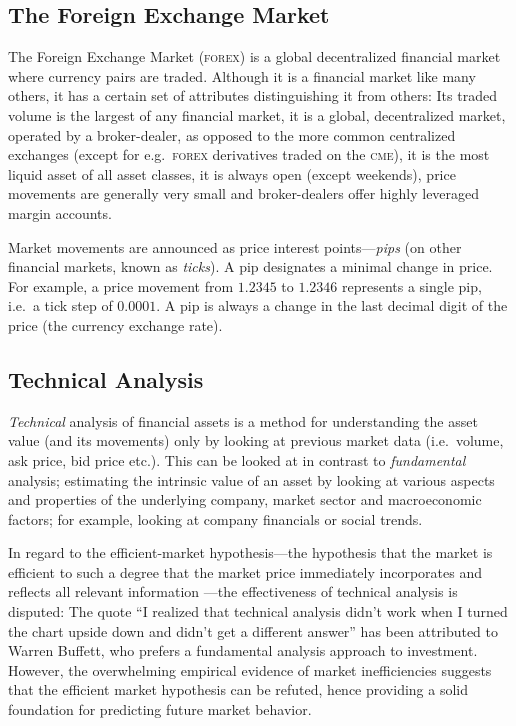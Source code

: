 \begin{multicols}{2}
\subsection{The Foreign Exchange Market}

The Foreign Exchange Market (\textsc{forex}) is a global decentralized financial
market where currency pairs are traded.  Although it is a financial market like
many others, it has a certain set of attributes distinguishing it from others:
Its traded volume is the largest of any financial market, it is a global,
decentralized market, operated by a broker-dealer, as opposed to the more common
centralized exchanges (except for e.g.\ \textsc{forex} derivatives traded on the
\textsc{cme}), it is the most liquid asset of all asset classes, it is always
open (except weekends), price movements are generally very small and
broker-dealers offer highly leveraged margin accounts.

Market movements are announced as price interest points---\textit{pips} (on
other financial markets, known as \textit{ticks}). A pip designates a minimal
change in price.  For example, a price movement from $1.2345$ to $1.2346$
represents a single pip, i.e.\ a tick step of $0.0001$.  A pip is always a
change in the last decimal digit of the price (the currency exchange rate).

\subsection{Technical Analysis}

\textit{Technical} analysis of financial assets is a method for understanding
the asset value (and its movements) only by looking at previous market data
(i.e.\ volume, ask price, bid price etc.).  This can be looked at in contrast to
\textit{fundamental} analysis; estimating the intrinsic value of an asset by
looking at various aspects and properties of the underlying company, market
sector and macroeconomic factors; for example, looking at company financials or
social trends.

In regard to the efficient-market hypothesis---the hypothesis that the market is
efficient to such a degree that the market price immediately incorporates and
reflects all relevant information \citep{fama1995random}---the effectiveness of
technical analysis is disputed: The quote ``I realized that technical analysis
didn't work when I turned the chart upside down and didn't get a different
answer'' has been attributed to Warren Buffett, who prefers a fundamental
analysis approach to investment.  However, the overwhelming empirical evidence
of market inefficiencies suggests that the efficient market hypothesis can be
refuted, hence providing a solid foundation for predicting future market
behavior.


\end{multicols}
